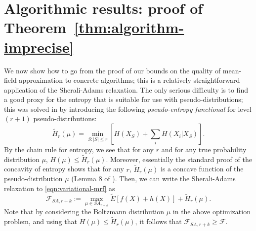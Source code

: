 \documentclass[11pt, oneside, english]{article}
\newcommand{\F}{\mathcal{F}}
\theoremstyle{definition}
\theoremstyle{plain}
\begin{document}
\section{Algorithmic results: proof of Theorem~\ref{thm:algorithm-imprecise}}
\label{s:algorithmic}
We now show how to go from the proof of our bounds on the quality of mean-field approximation to concrete algorithms; this is a relatively straightforward application of the Sherali-Adams relaxation. The only serious difficulty is to find a good proxy for the entropy that is suitable for use with pseudo-distributions; this was solved in \cite{risteski2016calculate} by introducing the following \emph{pseudo-entropy functional} for level $(r + 1)$ pseudo-distributions:
\begin{equation}
\tilde{H}_r(\mu) = \min_{S : |S| \le r} \left[H(X_S) + \sum_{i} H(X_i | X_S)\right].
\end{equation}
By the chain rule for entropy, we see that for any $r$ and for any true probability distribution $\mu$, $H(\mu) \le \tilde{H}_r(\mu)$. Moreover, essentially the standard proof of the concavity of entropy shows that for any $r$, $\tilde{H}_r(\mu)$ is a concave function of the pseudo-distribution $\mu$ (Lemma 8 of \cite{risteski2016calculate}).
Then, we can write the Sherali-Adams relaxation to \cref{eqn:variational-mrf} as
\begin{equation}\label{eqn:risteski-relaxation}
\F_{SA, r + k} := \max_{\mu \in SA_{r + k}} \tilde{E}[f(X) + h(X)] + \tilde{H}_r(\mu). 
\end{equation}
Note that by considering the Boltzmann distribution $\mu$ in the above optimization problem, and using that $H(\mu) \leq \tilde{H}_{r}(\mu)$, it follows that $\F_{SA,r+k} \geq \F$.
\end{document}
